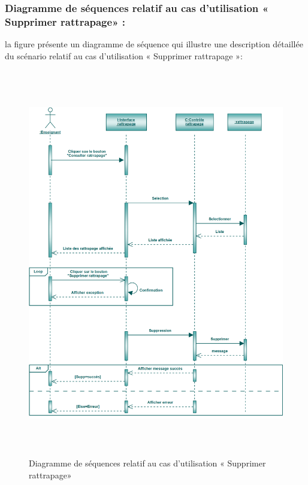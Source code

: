 \documentclass[12 pt]{report}
\begin{document}
\subsubsection{Diagramme de séquences relatif au cas d’utilisation « Supprimer rattrapage» :}
la figure   présente un diagramme de séquence qui illustre une description détaillée du scénario relatif au cas d’utilisation « Supprimer rattrapage »: 
\begin{figure}[h]
 \begin{center}
\includegraphics[width= 18 cm ,height=  17cm]{ssr.PNG}
\caption{Diagramme de séquences relatif au cas d’utilisation « Supprimer rattrapage»}

\end{center}
\end{figure}
\end{document}
